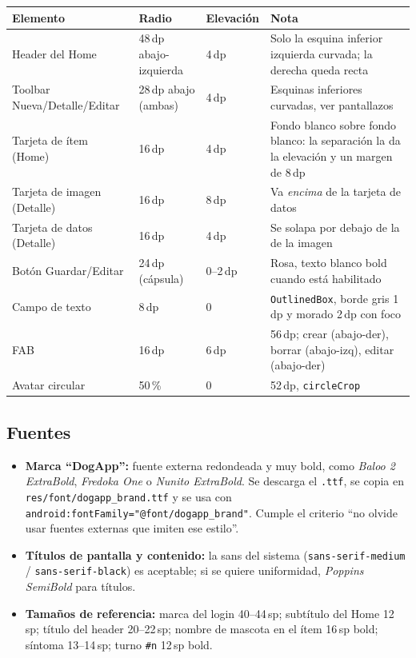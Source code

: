 \documentclass[11pt,letterpaper]{article}
\newcommand{\code}[1]{\texttt{\small #1}}
\begin{document}
\begin{center}
\small
\begin{xltabular}{\linewidth}{@{}l l l X@{}}
\toprule
\textbf{Elemento} & \textbf{Radio} & \textbf{Elevaci\'on} & \textbf{Nota}\\
\midrule
\endhead
\bottomrule
\endlastfoot
Header del Home & 48\,dp abajo-izquierda & 4\,dp & Solo la esquina inferior izquierda curvada; la derecha queda recta\\
Toolbar Nueva/Detalle/Editar & 28\,dp abajo (ambas) & 4\,dp & Esquinas inferiores curvadas, ver pantallazos\\
Tarjeta de \'item (Home) & 16\,dp & 4\,dp & Fondo blanco sobre fondo blanco: la separaci\'on la da la elevaci\'on y un margen de 8\,dp\\
Tarjeta de imagen (Detalle) & 16\,dp & 8\,dp & Va \emph{encima} de la tarjeta de datos\\
Tarjeta de datos (Detalle) & 16\,dp & 4\,dp & Se solapa por debajo de la de la imagen\\
Bot\'on Guardar/Editar & 24\,dp (c\'apsula) & 0--2\,dp & Rosa, texto blanco bold cuando est\'a habilitado\\
Campo de texto & 8\,dp & 0 & \code{OutlinedBox}, borde gris 1\,dp y morado 2\,dp con foco\\
FAB & 16\,dp & 6\,dp & 56\,dp; crear (abajo-der), borrar (abajo-izq), editar (abajo-der)\\
Avatar circular & 50\,\% & 0 & 52\,dp, \code{circleCrop}\\
\end{xltabular}
\end{center}

\subsection{Fuentes}

\begin{itemize}[leftmargin=1.4em,itemsep=2pt]
  \item \textbf{Marca ``DogApp'':} fuente externa redondeada y muy bold, como
        \emph{Baloo 2 ExtraBold}, \emph{Fredoka One} o \emph{Nunito ExtraBold}.
        Se descarga el \code{.ttf}, se copia en \code{res/font/dogapp\_brand.\allowbreak{}ttf}
        y se usa con \code{android:\allowbreak{}fontFamily=\allowbreak{}"@font/\allowbreak{}dogapp\_brand"}. Cumple el
        criterio ``no olvide usar fuentes externas que imiten ese estilo''.
  \item \textbf{T\'itulos de pantalla y contenido:} la sans del sistema
        (\code{sans-serif-medium} / \code{sans-serif-black}) es aceptable; si se
        quiere uniformidad, \emph{Poppins SemiBold} para t\'itulos.
  \item \textbf{Tama\~nos de referencia:} marca del login 40--44\,sp; subt\'itulo
        del Home 12\,sp; t\'itulo del header 20--22\,sp; nombre de mascota en el
        \'item 16\,sp bold; s\'intoma 13--14\,sp; turno \code{\#n} 12\,sp bold.
\end{itemize}
\end{document}
